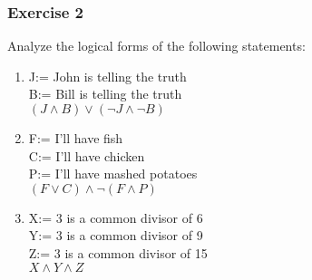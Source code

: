 
\subsubsection{Exercise 2}
\question Analyze the logical forms of the following statements:


\begin{solution}
    \begin{enumerate}[label=(\alph*)]
        \item J:= John is telling the truth \\
        B:= Bill is telling the truth \\
        $(J \wedge B) \vee (\neg J \wedge \neg B)$
        
        \item F:= I'll have fish \\
        C:= I'll have chicken \\
        P:= I'll have mashed potatoes \\
        $(F \vee C) \wedge \neg(F \wedge P)$
        
        \item X:= 3 is a common divisor of 6\\
        Y:= 3 is a common divisor of 9\\
        Z:= 3 is a common divisor of 15\\
        $X \wedge Y \wedge Z$
    \end{enumerate}
\end{solution}



